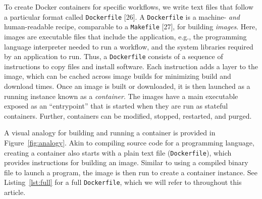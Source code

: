 \documentclass[10pt,letterpaper]{article}
\begin{document}
To create Docker containers for specific workflows, we write text files
that follow a particular format called \texttt{Dockerfile} {[}26{]}. A
\texttt{Dockerfile} is a machine- \emph{and} human-readable recipe,
comparable to a \texttt{Makefile} {[}27{]}, for building \emph{images}.
Here, images are executable files that include the application, e.g.,
the programming language interpreter needed to run a workflow, and the
system libraries required by an application to run. Thus, a
\texttt{Dockerfile} consists of a sequence of instructions to copy files
and install software. Each instruction adds a layer to the image, which
can be cached across image builds for minimizing build and download
times. Once an image is built or downloaded, it is then launched as a
running instance known as a \emph{container}. The images have a main
executable exposed as an ``entrypoint'' that is started when they are
run as stateful containers. Further, containers can be modified,
stopped, restarted, and purged.

A visual analogy for building and running a container is provided in
Figure~\ref{fig:analogy}. Akin to compiling source code for a
programming language, creating a container also starts with a plain text
file (\texttt{Dockerfile}), which provides instructions for building an
image. Similar to using a compiled binary file to launch a program, the
image is then run to create a container instance. See
Listing~\ref{lst:full} for a full \texttt{Dockerfile}, which we will
refer to throughout this article.
\end{document}
